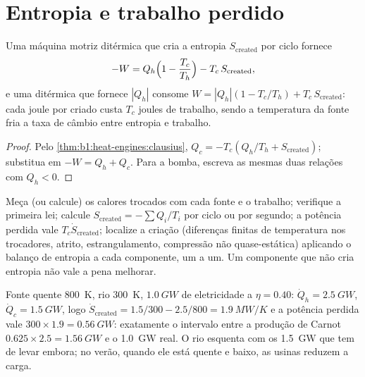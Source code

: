 \section{Entropia e trabalho perdido}

\begin{theorem}\label{thm:b1:heat-engines:lostwork}
Uma máquina motriz ditérmica que cria a entropia $S_{\mathrm{created}}$ por ciclo
fornece
\[
-W = Q_h\Bigl(1 - \frac{T_c}{T_h}\Bigr) - T_c\,S_{\mathrm{created}} ,
\]
e uma  ditérmica que fornece $|Q_h|$ consome
$W = |Q_h|(1 - T_c/T_h) + T_c\,S_{\mathrm{created}}$: cada joule por 
criado custa $T_c$ joules de trabalho, sendo a temperatura da fonte fria
a taxa de câmbio entre entropia e trabalho.
\end{theorem}

\begin{proof}
Pelo \cref{thm:b1:heat-engines:clausius}, $Q_c = -T_c(Q_h/T_h + S_{\mathrm{created}})$;
substitua em $-W = Q_h + Q_c$. Para a bomba, escreva as mesmas duas relações
com $Q_h < 0$.
\end{proof}

\begin{method}\label{meth:b1:heat-engines:audit}
Meça (ou calcule) os calores trocados com cada fonte e o trabalho;
verifique a primeira lei; calcule $S_{\mathrm{created}} = -\sum Q_i/T_i$ por ciclo
ou por segundo; a potência perdida vale $T_c\dot S_{\mathrm{created}}$; localize a
criação (diferenças finitas de temperatura nos trocadores, atrito,
estrangulamento, compressão não quase-estática) aplicando o balanço de
entropia a cada componente, um a um. Um componente que não cria entropia
não vale a pena melhorar.
\end{method}

\begin{example}\label{ex:b1:heat-engines:audit}
Fonte quente \qty{800}{K}, rio \qty{300}{K}, $\qty{1.0}{GW}$ de eletricidade
a $\eta = 0.40$: $\dot Q_h = \qty{2.5}{GW}$, $\dot Q_c = \qty{1.5}{GW}$, logo
$\dot S_{\mathrm{created}} = 1.5/300 - 2.5/800 = \qty{1.9}{MW/K}$ e a potência
perdida vale $300 \times 1.9 = \qty{0.56}{GW}$: exatamente o intervalo entre a
produção de Carnot $0.625 \times 2.5 = \qty{1.56}{GW}$ e o \qty{1.0}{GW} real.
O rio esquenta com os \qty{1.5}{GW} que tem de levar embora; no verão, quando
ele está quente e baixo, as usinas reduzem a carga.
\end{example}

